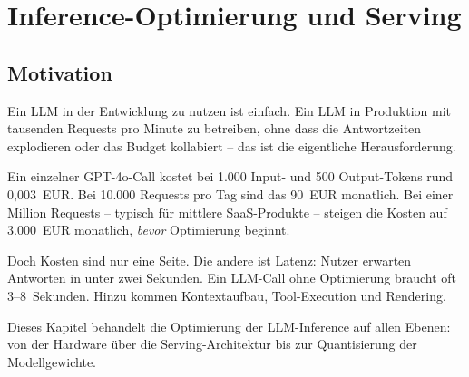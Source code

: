 \chapter{Inference-Optimierung und Serving}
\label{chap:inference_optimierung}


\section{Motivation}

Ein LLM in der Entwicklung zu nutzen ist einfach. Ein LLM in Produktion mit tausenden Requests pro Minute zu betreiben, ohne dass die Antwortzeiten explodieren oder das Budget kollabiert -- das ist die eigentliche Herausforderung.

Ein einzelner GPT-4o-Call kostet bei 1.000 Input- und 500 Output-Tokens rund 0,003~EUR. Bei 10.000 Requests pro Tag sind das 90~EUR monatlich. Bei einer Million Requests -- typisch für mittlere SaaS-Produkte -- steigen die Kosten auf 3.000~EUR monatlich, \textit{bevor} Optimierung beginnt.

Doch Kosten sind nur eine Seite. Die andere ist Latenz: Nutzer erwarten Antworten in unter zwei Sekunden. Ein LLM-Call ohne Optimierung braucht oft 3--8~Sekunden. Hinzu kommen Kontextaufbau, Tool-Execution und Rendering.

Dieses Kapitel behandelt die Optimierung der LLM-Inference auf allen Ebenen: von der Hardware über die Serving-Architektur bis zur Quantisierung der Modellgewichte.

